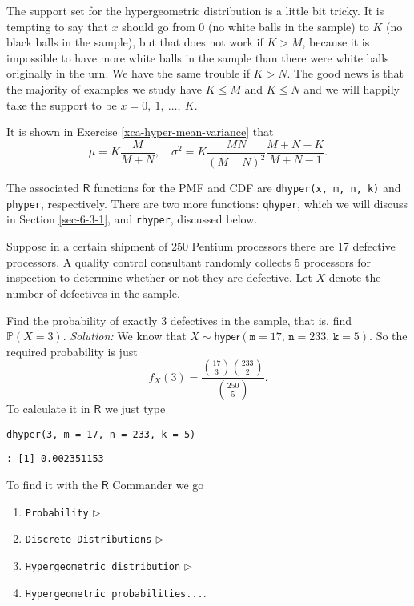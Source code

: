 The support set for the hypergeometric distribution is a little bit
tricky. It is tempting to say that \(x\) should go from 0 (no white
balls in the sample) to \(K\) (no black balls in the sample), but that
does not work if \(K>M\), because it is impossible to have more white
balls in the sample than there were white balls originally in the
urn. We have the same trouble if \(K>N\). The good news is that the
majority of examples we study have \(K\leq M\) and \(K\leq N\) and we
will happily take the support to be \(x=0,\ 1,\ \ldots,\ K\).

It is shown in Exercise \ref{xca-hyper-mean-variance} that
\begin{equation}
\mu=K\frac{M}{M+N},\quad \sigma^{2}=K\frac{MN}{(M+N)^{2}}\frac{M+N-K}{M+N-1}.
\end{equation}

The associated \(\mathsf{R}\) functions for the PMF and CDF are
\texttt{dhyper(x, m, n, k)} and \texttt{phyper}, respectively. There are two more
functions: \texttt{qhyper}, which we will discuss in Section
\ref{sec-6-3-1}, and \texttt{rhyper}, discussed below.


Suppose in a certain shipment of 250 Pentium processors there are 17
defective processors. A quality control consultant randomly collects 5
processors for inspection to determine whether or not they are
defective. Let \(X\) denote the number of defectives in the sample.

Find the probability of exactly 3 defectives in the sample, that is,
find \(\mathbb{P}(X=3)\).  \emph{Solution:} We know that
\(X\sim\mathsf{hyper}(\mathtt{m}=17,\,\mathtt{n}=233,\,\mathtt{k}=5)\). So
the required probability is just \[ f_{X}(3)=\frac{{17 \choose 3}{233
\choose 2}}{{250 \choose 5}}.  \] To calculate it in \(\mathsf{R}\) we
just type

\begin{verbatim}
dhyper(3, m = 17, n = 233, k = 5)
\end{verbatim}

\begin{verbatim}
: [1] 0.002351153
\end{verbatim}

To find it with the \(\mathsf{R}\) Commander we go 
\begin{enumerate}
\item \texttt{Probability} \(\triangleright\)
\item \texttt{Discrete Distributions} \(\triangleright\)
\item \texttt{Hypergeometric distribution} \(\triangleright\)
\item \texttt{Hypergeometric probabilities...}.
\end{enumerate}

